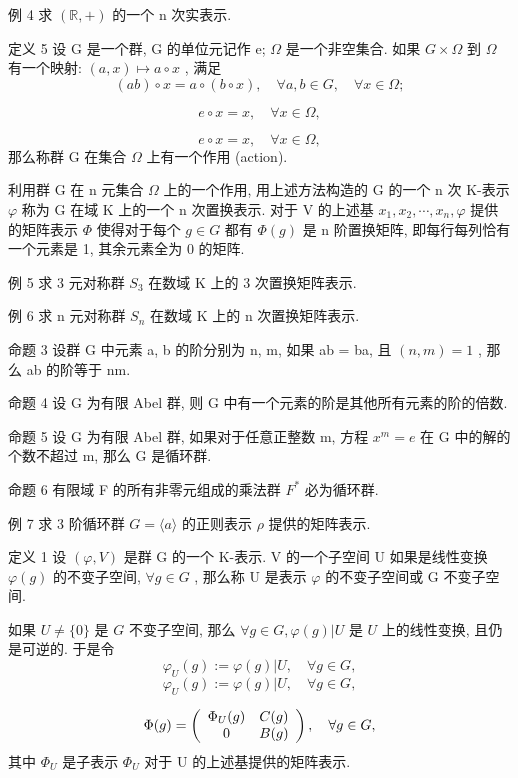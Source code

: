 \documentclass[]{article}
\begin{document}
例 4 求 $(\mathbb{R}, +)$ 的一个 n 次实表示.  

定义 5 设 G 是一个群, G 的单位元记作 e; $\Omega$ 是一个非空集合. 如果 $G \times \Omega$ 到 $\Omega$ 有一个映射: $(a, x) \mapsto a \circ x$ , 满足 $$
(a b) \circ x = a \circ (b \circ x), \quad \forall a, b \in G, \quad \forall x \in \Omega ;
$$

$$
e \circ x = x, \quad \forall x \in \Omega ,
$$

$$
e \circ x = x, \quad \forall x \in \Omega ,
$$
那么称群 G 在集合 $\Omega$ 上有一个作用 (action). 

利用群 G 在 n 元集合 $\Omega$ 上的一个作用, 用上述方法构造的 G 的一个 n 次 K-表示 $\varphi$ 称为 G 在域 K 上的一个 n 次置换表示. 对于 V 的上述基 $x_{1}, x_{2}, \cdots, x_{n}, \varphi$ 提供的矩阵表示 $\Phi$ 使得对于每个 $g \in G$ 都有 $\Phi(g)$ 是 n 阶置换矩阵, 即每行每列恰有一个元素是 1, 其余元素全为 0 的矩阵. 

例 5 求 3 元对称群 $S_{3}$ 在数域 K 上的 3 次置换矩阵表示. 

例 6 求 n 元对称群 $S_{n}$ 在数域 K 上的 n 次置换矩阵表示. 

命题 3 设群 G 中元素 a, b 的阶分别为 n, m, 如果 ab = ba, 且 $(n, m) = 1$ , 那么 ab 的阶等于 nm. 

命题 4 设 G 为有限 Abel 群, 则 G 中有一个元素的阶是其他所有元素的阶的倍数. 

命题 5 设 G 为有限 Abel 群, 如果对于任意正整数 m, 方程 $x^{m} = e$ 在 G 中的解的个数不超过 m, 那么 G 是循环群. 

命题 6 有限域 F 的所有非零元组成的乘法群 $F^{*}$ 必为循环群. 

例 7 求 3 阶循环群 $G = \langle a \rangle$ 的正则表示 $\rho$ 提供的矩阵表示. 

定义 1 设 $(\varphi, V)$ 是群 G 的一个 K-表示. V 的一个子空间 U 如果是线性变换 $\varphi(g)$ 的不变子空间, $\forall g \in G$ , 那么称 U 是表示 $\varphi$ 的不变子空间或 G 不变子空间. 

如果 $U \neq \{0\}$ 是 $G$ 不变子空间, 那么 $\forall g \in G, \varphi(g)|U$ 是 $U$ 上的线性变换, 且仍是可逆的. 于是令 
$$
\varphi_ {U} (g) := \varphi (g) | U, \quad \forall g \in G,
$$
$$
\varphi_ {U} (g) := \varphi (g) | U, \quad \forall g \in G,
$$

$$
\Phi (g) = \left( \begin{array}{c c} \Phi_ {U} (g) & C (g) \\ 0 & B (g) \end{array} \right), \quad \forall g \in G, 
$$其中 $\Phi_{U}$ 是子表示 $\Phi_{U}$ 对于 U 的上述基提供的矩阵表示. 
\end{document}
